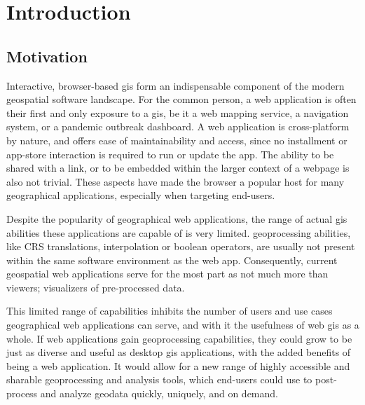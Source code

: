 
\newpage
\section{Introduction}

\subsection{Motivation}

Interactive, browser-based \ac{gis} form an indispensable component of the modern geospatial software landscape. For the common person, a web application is often their first and only exposure to a \ac{gis}, be it a web mapping service, a navigation system, or a pandemic outbreak dashboard. A web application is cross-platform by nature, and offers ease of maintainability and access, since no installment or app-store interaction is required to run or update the app. The ability to be shared with a link, or to be embedded within the larger context of a webpage is also not trivial. These aspects have made the browser a popular host for many geographical applications, especially when targeting end-users. 

Despite the popularity of geographical web applications, the range of actual \ac{gis} abilities these applications are capable of is very limited. \ac{geoprocessing} abilities, like CRS translations, interpolation or boolean operators, are usually not present within the same software environment as the web app. Consequently, current geospatial web applications serve for the most part as not much more than viewers; visualizers of pre-processed data. 

This limited range of capabilities inhibits the number of users and use cases geographical web applications can serve, and with it the usefulness of web \ac{gis} as a whole. If web applications gain \ac{geoprocessing} capabilities, they could grow to be just as diverse and useful as desktop \ac{gis} applications, with the added benefits of being a web application. It would allow for a new range of highly accessible and sharable geoprocessing and analysis tools, which end-users could use to post-process and analyze geodata quickly, uniquely, and on demand.

